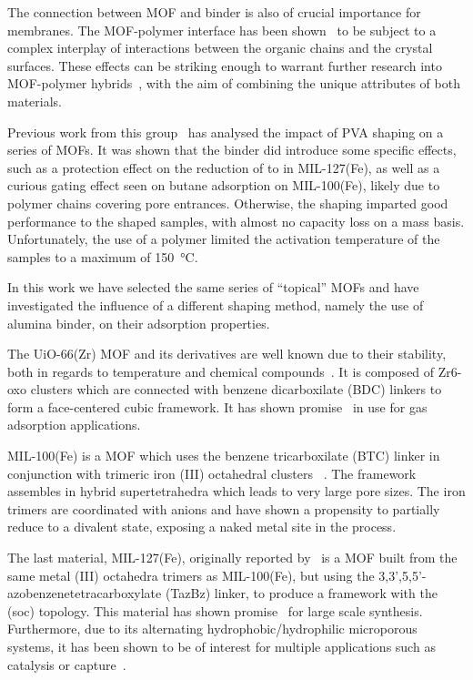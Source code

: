 The connection between MOF and binder is also of crucial importance
for membranes. The MOF-polymer interface has been 
shown~\cite{seminoMicroscopicModelMetal2016} to be
subject to a complex interplay of interactions between the organic
chains and the crystal surfaces. These effects can be striking enough 
to warrant further research into MOF-polymer 
hybrids~\cite{kitaoHybridizationMOFsPolymers2017}, with the aim 
of combining the unique attributes of both materials.

Previous work from this group~\cite{chanutObservingEffectsShaping2016} 
has analysed the impact of PVA shaping on a series of MOFs. It was 
shown that the binder did introduce some specific effects, such as 
a protection effect on the reduction of  to
 in MIL-127(Fe), as well as a curious gating effect seen on 
butane adsorption on MIL-100(Fe), likely due to polymer chains covering 
pore entrances. Otherwise, the shaping imparted good performance to the
shaped samples, with almost no capacity loss on
a mass basis. Unfortunately, the use of a polymer limited the 
activation temperature of the samples to a maximum of 
\SI{150}{\degreeCelsius}.

In this work we have selected the same series of ``topical'' MOFs and 
have investigated the influence of a different shaping method, namely 
the use of alumina binder, on their adsorption properties.

The UiO-66(Zr) MOF and its derivatives are well known due to their 
stability, both in regards to temperature and chemical 
compounds~\cite{cavkaNewZirconiumInorganic2008}. It is composed of
Zr6-oxo clusters which are connected with benzene dicarboxilate 
(BDC) linkers to form a face-centered cubic framework. It has 
shown promise~\cite{wiersumEvaluationUiO66GasBased2011}
in use for gas adsorption applications.

MIL-100(Fe) is a MOF which uses the benzene tricarboxilate (BTC) linker 
in conjunction with trimeric iron (III) octahedral clusters
~\cite{horcajadaSynthesisCatalyticProperties2007}.
The framework assembles in hybrid supertetrahedra which leads to very 
large pore sizes. The iron trimers are coordinated with
anions and have shown a propensity to partially reduce to a divalent 
 state, exposing a naked metal site in the process.\cite{yoonControlledReducibilityMetalOrganic2010}

The last material, MIL-127(Fe), originally reported 
by~\citeauthor{liuAssemblyMetalOrganic2007} is a MOF built from the same
metal (III) octahedra trimers as MIL-100(Fe), but using the
3,3',5,5'-azobenzenetetracarboxylate (TazBz) linker, to produce a 
framework with the (soc) topology. This material has shown 
promise~\cite{chevreauSynthesisBiocompatibleHighly2016}
for large scale synthesis. Furthermore, due to its alternating
hydrophobic/hydrophilic microporous systems, it has been shown to be
of interest for multiple applications such as catalysis or 
 capture~\cite{chanutScreeningEffectWater2017}.

